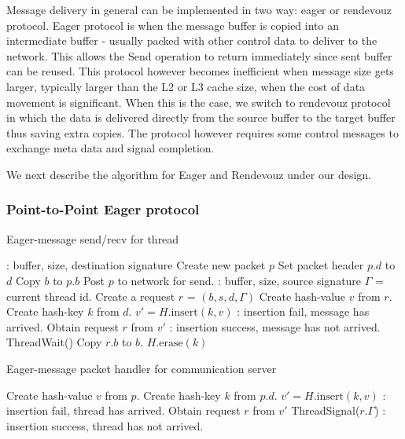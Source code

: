 \documentclass[11pt]{article}
\begin{document}
Message delivery in general can be implemented in two way: eager or rendevouz
protocol. Eager protocol is when the message buffer is copied into an
intermediate buffer - usually packed with other control data to deliver to the
network. This allows the Send operation to return immediately since sent buffer
can be reused.  This protocol however becomes inefficient when message size
gets larger, typically larger than the L2 or L3 cache size, when the cost of
data movement is significant.  When this is the case, we switch to rendevouz
protocol in which the data is delivered directly from the source buffer to the
target buffer thus saving extra copies.  The protocol however requires
some control messages to exchange meta data and signal completion.

We next describe the algorithm for Eager and Rendevouz under our design.
\subsubsection{Point-to-Point Eager protocol}

\begin{algorithm}
  \caption{Eager-message send/recv for thread}
  \label{algo:short}
  \begin{algorithmic}[1] %
     \Comment: buffer, size, destination signature 
      \State Create new packet $p$
      \State Set packet header $p.d$ to $d$
      \State Copy $b$ to $p.b$
      \State Post $p$ to network for send.
    \EndProcedure
     \Comment: buffer, size, source signature 
      \State $\Gamma$ = current thread id.
      \State Create a request $r$ = $(b,s,d,\Gamma)$
      \State Create hash-value $v$ from $r$.
      \State Create hash-key $k$ from $d$.
      \State $v' = H.\text{insert}(k,v)$
        \Comment: insertion fail, message has arrived.
        \State Obtain request $r$ from $v'$
      \Else
        \Comment: insertion success, message has not arrived.
        \State ThreadWait()
      \EndIf
      \State Copy $r.b$ to $b$.
      \State $H.\text{erase}(k)$
    \EndProcedure
  \end{algorithmic}
\end{algorithm}

\begin{algorithm}
  \caption{Eager-message packet handler for communication server}
  \label{algo:server-short}
  \begin{algorithmic}[1]
      \State Create hash-value $v$ from $p$.
      \State Create hash-key $k$ from $p.d$.
      \State $v' = H.\text{insert}(k,v)$
        \Comment: insertion fail, thread has arrived.
        \State Obtain request $r$ from $v'$
        \State ThreadSignal($r.\Gamma$)
      \Else
        \Comment: insertion success, thread has not arrived.
        \State \Return
      \EndIf
    \EndProcedure
  \end{algorithmic}
\end{algorithm}
\end{document}
